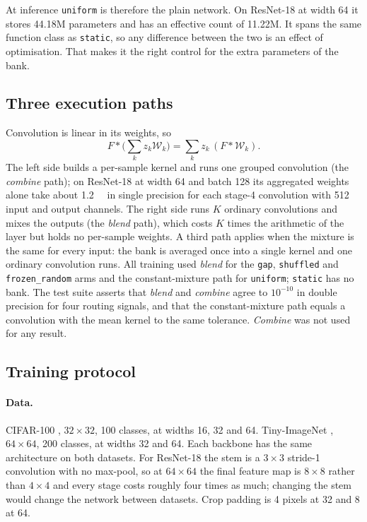 \documentclass[10pt,a4paper]{article}
\begin{document}
At inference \texttt{uniform} is therefore the plain network. On
ResNet-18 at width 64 it stores 44.18M parameters and has an effective
count of 11.22M. It spans the same function class as \texttt{static}, so
any difference between the two is an effect of optimisation. That makes it
the right control for the extra parameters of the bank.

\subsection{Three execution paths}

Convolution is linear in its weights, so
\begin{equation}
F*\Big(\sum_k z_k\mathcal{W}_k\Big)=\sum_k z_k\,(F*\mathcal{W}_k).
\label{eq:lin}
\end{equation}
The left side builds a per-sample kernel and runs one grouped convolution
(the \emph{combine} path); on ResNet-18 at width 64 and batch 128 its
aggregated weights alone take about \SI{1.2}{\giga\byte} in single
precision for each stage-4 convolution with 512 input and output channels.
The right side runs $K$ ordinary convolutions and mixes the outputs (the
\emph{blend} path), which costs $K$ times the arithmetic of the layer but
holds no per-sample weights. A third path applies when the mixture is the
same for every input: the bank is averaged once into a single kernel and
one ordinary convolution runs. All training used \emph{blend} for the
\texttt{gap}, \texttt{shuffled} and \texttt{frozen\_random} arms and the
constant-mixture path for \texttt{uniform}; \texttt{static} has no bank.
The test suite asserts that \emph{blend} and \emph{combine} agree to
$10^{-10}$ in double precision for four routing signals, and that the
constant-mixture path equals a convolution with the mean kernel to the same
tolerance. \emph{Combine} was not used for any result.

\subsection{Training protocol}

\paragraph{Data.} CIFAR-100 \citep{krizhevsky2009}, $32\times32$, 100
classes, at widths 16, 32 and 64. Tiny-ImageNet \citep{le2015tiny},
$64\times64$, 200 classes, at widths 32 and 64. Each backbone has the
same architecture on both datasets. For ResNet-18 the stem is a
$3\times3$ stride-1 convolution with no max-pool, so at $64\times64$ the
final feature map is $8\times8$ rather than $4\times4$ and every stage
costs roughly four times as much; changing the stem would change the
network between datasets. Crop
padding is 4 pixels at 32 and 8 at 64.
\end{document}
